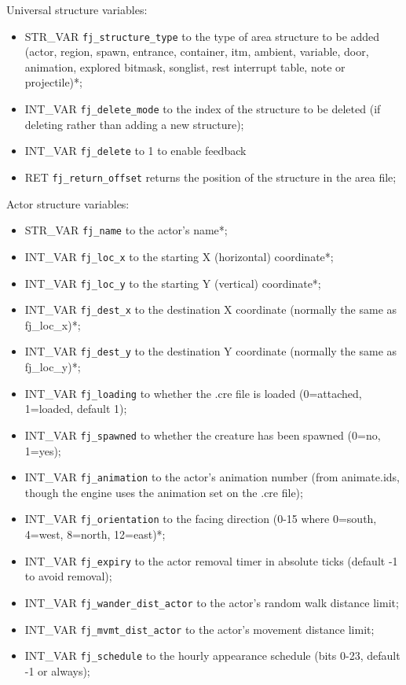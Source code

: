 \documentclass{article}
\begin{document}
Universal structure variables:
\begin{itemize}
\item STR_VAR \verb+fj_structure_type+ to the type of area structure to be added (actor, region, spawn, entrance, container, itm, ambient, variable, door, animation, explored bitmask, songlist, rest interrupt table, note or projectile)*;
\item INT_VAR \verb+fj_delete_mode+ to the index of the structure to be deleted (if deleting rather than adding a new structure);
\item INT_VAR \verb+fj_delete+ to 1 to enable feedback
\item RET \verb+fj_return_offset+ returns the position of the structure in the area file;
\end{itemize}
Actor structure variables:
\begin{itemize}
\item STR_VAR \verb+fj_name+ to the actor's name*;
\item INT_VAR \verb+fj_loc_x+ to the starting X (horizontal) coordinate*;
\item INT_VAR \verb+fj_loc_y+ to the starting Y (vertical) coordinate*;
\item INT_VAR \verb+fj_dest_x+ to the destination X coordinate (normally the same as fj_loc_x)*;
\item INT_VAR \verb+fj_dest_y+ to the destination Y coordinate (normally the same as fj_loc_y)*;
\item INT_VAR \verb+fj_loading+ to whether the .cre file is loaded (0=attached, 1=loaded, default 1);
\item INT_VAR \verb+fj_spawned+ to whether the creature has been spawned (0=no, 1=yes);
\item INT_VAR \verb+fj_animation+ to the actor's animation number (from animate.ids, though the engine uses the animation set on the .cre file);
\item INT_VAR \verb+fj_orientation+ to the facing direction (0-15 where 0=south, 4=west, 8=north, 12=east)*;
\item INT_VAR \verb+fj_expiry+ to the actor removal timer in absolute ticks (default -1 to avoid removal);
\item INT_VAR \verb+fj_wander_dist_actor+ to the actor's random walk distance limit;
\item INT_VAR \verb+fj_mvmt_dist_actor+ to the actor's movement distance limit;
\item INT_VAR \verb+fj_schedule+ to the hourly appearance schedule (bits 0-23, default -1 or always);

\end{itemize}
\end{document}

